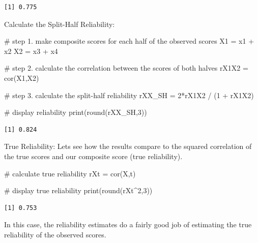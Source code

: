 \documentclass[
  letterpaper,
  DIV=11,
  numbers=noendperiod]{scrreprt}
\newenvironment{Shaded}{\begin{snugshade}}{\end{snugshade}}
\newcommand{\CommentTok}[1]{\textcolor[rgb]{0.37,0.37,0.37}{#1}}
\newcommand{\DecValTok}[1]{\textcolor[rgb]{0.68,0.00,0.00}{#1}}
\newcommand{\FunctionTok}[1]{\textcolor[rgb]{0.28,0.35,0.67}{#1}}
\newcommand{\NormalTok}[1]{\textcolor[rgb]{0.00,0.23,0.31}{#1}}
\newcommand{\OtherTok}[1]{\textcolor[rgb]{0.00,0.23,0.31}{#1}}
\newcommand{\SpecialCharTok}[1]{\textcolor[rgb]{0.37,0.37,0.37}{#1}}
\begin{document}
\begin{verbatim}
[1] 0.775
\end{verbatim}

Calculate the Split-Half Reliability:

\begin{Shaded}
\begin{Highlighting}[]
\CommentTok{\# step 1. make composite scores for each half of the observed scores}
\NormalTok{X1 }\OtherTok{=}\NormalTok{ x1 }\SpecialCharTok{+}\NormalTok{ x2}
\NormalTok{X2 }\OtherTok{=}\NormalTok{ x3 }\SpecialCharTok{+}\NormalTok{ x4}

\CommentTok{\# step 2. calculate the correlation between the scores of both halves}
\NormalTok{rX1X2 }\OtherTok{=} \FunctionTok{cor}\NormalTok{(X1,X2)}

\CommentTok{\# step 3. calculate the split{-}half reliability}
\NormalTok{rXX\_SH }\OtherTok{=} \DecValTok{2}\SpecialCharTok{*}\NormalTok{rX1X2 }\SpecialCharTok{/}\NormalTok{ (}\DecValTok{1} \SpecialCharTok{+}\NormalTok{ rX1X2)}

\CommentTok{\# display reliability}
\FunctionTok{print}\NormalTok{(}\FunctionTok{round}\NormalTok{(rXX\_SH,}\DecValTok{3}\NormalTok{)) }
\end{Highlighting}
\end{Shaded}

\begin{verbatim}
[1] 0.824
\end{verbatim}

True Reliability: Lets see how the results compare to the squared
correlation of the true scores and our composite score (true
reliability).

\begin{Shaded}
\begin{Highlighting}[]
\CommentTok{\# calculate true reliability}
\NormalTok{rXt }\OtherTok{=} \FunctionTok{cor}\NormalTok{(X,t)}

\CommentTok{\# display true reliability}
\FunctionTok{print}\NormalTok{(}\FunctionTok{round}\NormalTok{(rXt}\SpecialCharTok{\^{}}\DecValTok{2}\NormalTok{,}\DecValTok{3}\NormalTok{)) }
\end{Highlighting}
\end{Shaded}

\begin{verbatim}
[1] 0.753
\end{verbatim}

In this case, the reliability estimates do a fairly good job of
estimating the true reliability of the observed scores.
\end{document}
